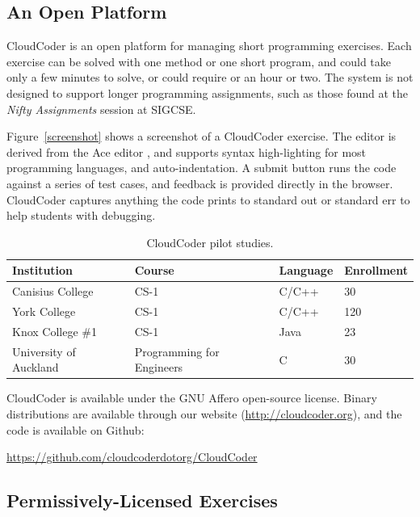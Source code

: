 \documentclass{sig-alternate}
\begin{document}
\subsection{An Open Platform}

CloudCoder is an open platform for managing short programming
exercises.  Each exercise can be solved with one method or one short
program, and could take only a few minutes to solve, or could require
or an hour or two.  The system is not designed to support longer
programming assignments, such as those found at the {\em Nifty
Assignments} session at SIGCSE.

Figure~\ref{screenshot} shows a screenshot of a CloudCoder exercise.
The editor is derived from the Ace editor \cite{ace}, and supports
syntax high-lighting for most programming languages, and
auto-indentation.  
A submit button runs the code against a series of
test cases, and feedback is provided directly in the browser.
CloudCoder captures anything the code prints to standard out or
standard err to help students with debugging.

\begin{table}
\centering
\begin{tabular}{| l | l | l | l |}
\hline
Institution & Course & Language & Enrollment\\
\hline
Canisius College & CS-1 & C/C++ & 30\\
York College & CS-1 & C/C++ & 120\\
Knox College \#1 & CS-1 & Java & 23\\
University of Auckland & Programming for Engineers & C & 30\\
\hline
\end{tabular}
\caption{CloudCoder pilot studies.}
\label{tab:courses}
\end{table}

CloudCoder is available under the GNU Affero open-source license.
Binary distributions are available through our website (\url{http://cloudcoder.org}),
and the code is available on Github:

\vspace*{3mm} 
\url{https://github.com/cloudcoderdotorg/CloudCoder}
\vspace*{3mm}


\subsection{Permissively-Licensed Exercises}
\end{document}
